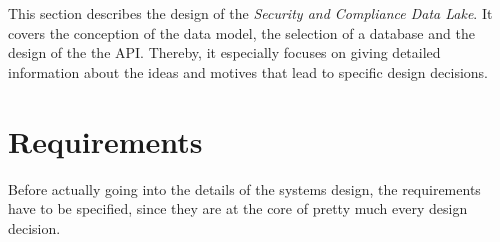 
This section describes the design of the \textit{Security and Compliance Data Lake}. It covers the conception of the data model, the selection of a database and the design of the the API. Thereby, it especially focuses on giving detailed information about the ideas and motives that lead to specific design decisions.

\section{Requirements}
Before actually going into the details of the systems design, the requirements have to be specified, since they are at the core of pretty much every design decision. 

